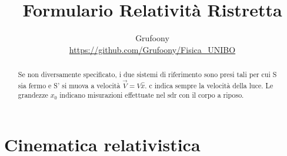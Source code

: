 \documentclass[a4paper]{article}
\begin{document}
	\title{Formulario Relatività Ristretta}
	\author{Grufoony\\\url{https://github.com/Grufoony/Fisica_UNIBO}}
	\maketitle
    \begin{abstract}
        Se non diversamente specificato, i due sistemi di riferimento sono presi tali per cui S sia fermo e S' si muova a velocità $\vec{V}=V\hat{x}$.
        c indica sempre la velocità della luce. Le grandezze $x_0$ indicano misurazioni effettuate nel sdr con il corpo a riposo.
    \end{abstract}
    \section{Cinematica relativistica}
\end{document}
